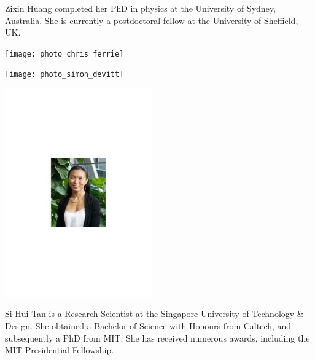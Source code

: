Zixin Huang completed her PhD in physics at the University of Sydney, Australia. She is currently a postdoctoral fellow at the University of Sheffield, UK.


%
%

\begin{center}
\texttt{[image: photo\_chris\_ferrie]}
\end{center}


%
%

\begin{center}
\texttt{[image: photo\_simon\_devitt]}
\end{center}


%
%

\begin{center}
\includegraphics[width=0.475\textwidth]{photo_sihui_tan}
\end{center}

Si-Hui Tan is a Research Scientist at the Singapore University of Technology \& Design. She obtained a Bachelor of Science with Honours from Caltech, and subsequently a PhD from MIT. She has received numerous awards, including the MIT Presidential Fellowship.


%
%


